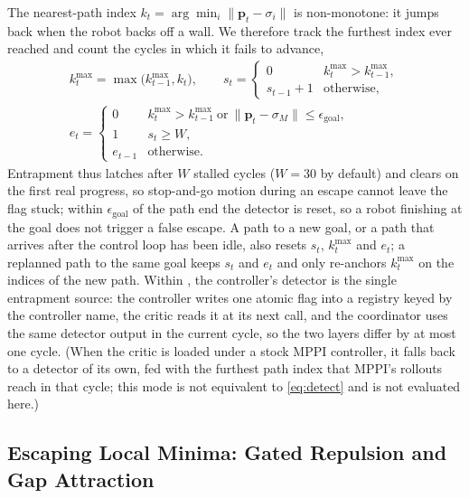 The nearest-path index $k_t=\arg\min_i\|\mathbf{p}_t-\sigma_i\|$ is non-monotone: it jumps back when the robot backs off a wall. We therefore track the furthest index ever reached and count the cycles in which it fails to advance,
\begin{equation}\label{eq:detect}
\begin{gathered}
k^{\max}_t=\max\big(k^{\max}_{t-1},k_t\big),\qquad
s_t=\begin{cases}0 & k^{\max}_t>k^{\max}_{t-1},\\ s_{t-1}+1 & \text{otherwise},\end{cases}\\
e_t=\begin{cases}0 & k^{\max}_t>k^{\max}_{t-1}\ \text{or}\ \|\mathbf{p}_t-\sigma_M\|\le\epsilon_{\mathrm{goal}},\\ 1 & s_t\ge W,\\ e_{t-1} & \text{otherwise}.\end{cases}
\end{gathered}
\end{equation}
Entrapment thus latches after $W$ stalled cycles ($W=30$ by default) and clears on the first real progress, so stop-and-go motion during an escape cannot leave the flag stuck; within $\epsilon_{\mathrm{goal}}$ of the path end the detector is reset, so a robot finishing at the goal does not trigger a false escape. A path to a new goal, or a path that arrives after the control loop has been idle, also resets $s_t$, $k^{\max}_t$ and $e_t$; a replanned path to the same goal keeps $s_t$ and $e_t$ and only re-anchors $k^{\max}_t$ on the indices of the new path. Within \sname, the controller's detector is the single entrapment source: the controller writes one atomic flag into a registry keyed by the controller name, the critic reads it at its next call, and the coordinator uses the same detector output in the current cycle, so the two layers differ by at most one cycle. (When the critic is loaded under a stock MPPI controller, it falls back to a detector of its own, fed with the furthest path index that MPPI's rollouts reach in that cycle; this mode is not equivalent to \eqref{eq:detect} and is not evaluated here.)

\subsection{Escaping Local Minima: Gated Repulsion and Gap Attraction}\label{sec:escape}

